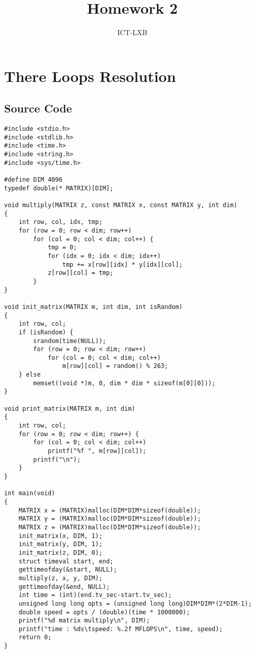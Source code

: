 \documentclass[a4paper, 11pt]{article}
\title{Homework 2}
\author{ICT-LXB}
\begin{document}
\maketitle
\tableofcontents
\section{There Loops Resolution}

\subsection{Source Code}
\begin{verbatim}
#include <stdio.h>
#include <stdlib.h>
#include <time.h>
#include <string.h>
#include <sys/time.h>

#define DIM 4096
typedef double(* MATRIX)[DIM];

void multiply(MATRIX z, const MATRIX x, const MATRIX y, int dim)
{
    int row, col, idx, tmp;
    for (row = 0; row < dim; row++)
        for (col = 0; col < dim; col++) {
            tmp = 0;
            for (idx = 0; idx < dim; idx++)
                tmp += x[row][idx] * y[idx][col];
            z[row][col] = tmp;
        }
}

void init_matrix(MATRIX m, int dim, int isRandom)
{
    int row, col;
    if (isRandom) {
        srandom(time(NULL));
        for (row = 0; row < dim; row++)
            for (col = 0; col < dim; col++)
                m[row][col] = random() % 263;
    } else
        memset((void *)m, 0, dim * dim * sizeof(m[0][0]));
}

void print_matrix(MATRIX m, int dim)
{
    int row, col;
    for (row = 0; row < dim; row++) {
        for (col = 0; col < dim; col++)
            printf("%f ", m[row][col]);
        printf("\n");
    }
}

int main(void)
{
    MATRIX x = (MATRIX)malloc(DIM*DIM*sizeof(double));
    MATRIX y = (MATRIX)malloc(DIM*DIM*sizeof(double));
    MATRIX z = (MATRIX)malloc(DIM*DIM*sizeof(double));
    init_matrix(x, DIM, 1);
    init_matrix(y, DIM, 1);
    init_matrix(z, DIM, 0);
    struct timeval start, end;
    gettimeofday(&start, NULL);
    multiply(z, x, y, DIM);
    gettimeofday(&end, NULL);
    int time = (int)(end.tv_sec-start.tv_sec);
    unsigned long long opts = (unsigned long long)DIM*DIM*(2*DIM-1);
    double speed = opts / (double)(time * 1000000);
    printf("%d matrix multiply\n", DIM);
    printf("time : %ds\tspeed: %.2f MFLOPS\n", time, speed);
    return 0;
}
\end{verbatim}
\end{document}
